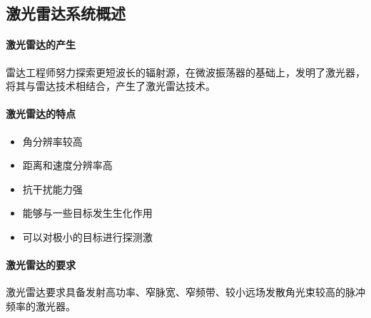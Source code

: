 \subsection{激光雷达系统概述} %

\paragraph{激光雷达的产生}雷达工程师努力探索更短波长的辐射源，在微波振荡器的基础上，发明了激光器，将其与雷达技术相结合，产生了激光雷达技术。

\paragraph{激光雷达的特点}
\begin{itemize}
	\item 角分辨率较高
	\item 距离和速度分辨率高
	\item 抗干扰能力强
	\item 能够与一些目标发生生化作用
	\item 可以对极小的目标进行探测激
\end{itemize}

\paragraph{激光雷达的要求} 激光雷达要求具备发射高功率、窄脉宽、窄频带、较小远场发散角光束较高的脉冲频率的激光器。

